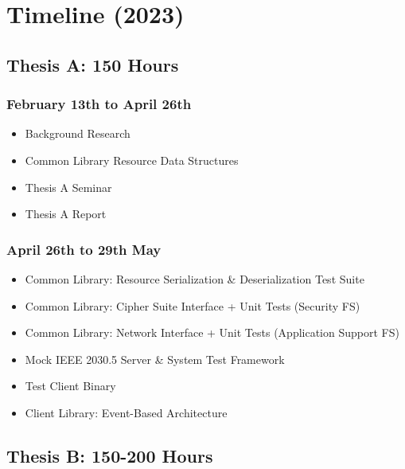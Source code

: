 \chapter{Timeline (2023)}\label{ch:timeline}
\section{Thesis A: 150 Hours}

\subsection{February 13th to April 26th}
\begin{itemize}
    \item Background Research
    \item Common Library Resource Data Structures
    \item Thesis A Seminar
    \item Thesis A Report
\end{itemize}

\subsection{April 26th to 29th May}
\begin{itemize}
    \item Common Library: Resource Serialization \& Deserialization Test Suite
    \item Common Library: Cipher Suite Interface + Unit Tests (Security FS)
    \item Common Library: Network Interface + Unit Tests (Application Support FS)
    \item Mock IEEE 2030.5 Server \& System Test Framework
    \item Test Client Binary
    \item Client Library: Event-Based Architecture
\end{itemize}


\section{Thesis B: 150-200 Hours }

